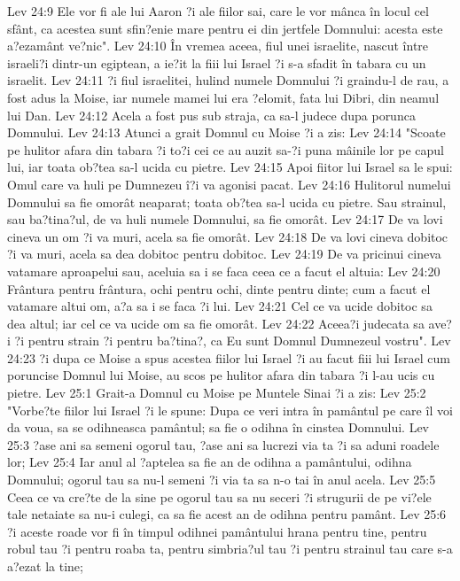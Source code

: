 Lev 24:9  Ele vor fi ale lui Aaron ?i ale fiilor sai, care le vor mânca în locul cel sfânt, ca acestea sunt sfin?enie mare pentru ei din jertfele Domnului: acesta este a?ezamânt ve?nic".
Lev 24:10  În vremea aceea, fiul unei israelite, nascut între israeli?i dintr-un egiptean, a ie?it la fiii lui Israel ?i s-a sfadit în tabara cu un israelit.
Lev 24:11  ?i fiul israelitei, hulind numele Domnului ?i graindu-l de rau, a fost adus la Moise, iar numele mamei lui era ?elomit, fata lui Dibri, din neamul lui Dan.
Lev 24:12  Acela a fost pus sub straja, ca sa-l judece dupa porunca Domnului.
Lev 24:13  Atunci a grait Domnul cu Moise ?i a zis:
Lev 24:14  "Scoate pe hulitor afara din tabara ?i to?i cei ce au auzit sa-?i puna mâinile lor pe capul lui, iar toata ob?tea sa-l ucida cu pietre.
Lev 24:15  Apoi fiitor lui Israel sa le spui: Omul care va huli pe Dumnezeu î?i va agonisi pacat.
Lev 24:16  Hulitorul numelui Domnului sa fie omorât neaparat; toata ob?tea sa-l ucida cu pietre. Sau strainul, sau ba?tina?ul, de va huli numele Domnului, sa fie omorât.
Lev 24:17  De va lovi cineva un om ?i va muri, acela sa fie omorât.
Lev 24:18  De va lovi cineva dobitoc ?i va muri, acela sa dea dobitoc pentru dobitoc.
Lev 24:19  De va pricinui cineva vatamare aproapelui sau, aceluia sa i se faca ceea ce a facut el altuia:
Lev 24:20  Frântura pentru frântura, ochi pentru ochi, dinte pentru dinte; cum a facut el vatamare altui om, a?a sa i se faca ?i lui.
Lev 24:21  Cel ce va ucide dobitoc sa dea altul; iar cel ce va ucide om sa fie omorât.
Lev 24:22  Aceea?i judecata sa ave?i ?i pentru strain ?i pentru ba?tina?, ca Eu sunt Domnul Dumnezeul vostru".
Lev 24:23  ?i dupa ce Moise a spus acestea fiilor lui Israel ?i au facut fiii lui Israel cum poruncise Domnul lui Moise, au scos pe hulitor afara din tabara ?i l-au ucis cu pietre.
Lev 25:1  Grait-a Domnul cu Moise pe Muntele Sinai ?i a zis:
Lev 25:2  "Vorbe?te fiilor lui Israel ?i le spune: Dupa ce veri intra în pamântul pe care îl voi da voua, sa se odihneasca pamântul; sa fie o odihna în cinstea Domnului.
Lev 25:3  ?ase ani sa semeni ogorul tau, ?ase ani sa lucrezi via ta ?i sa aduni roadele lor;
Lev 25:4  Iar anul al ?aptelea sa fie an de odihna a pamântului, odihna Domnului; ogorul tau sa nu-l semeni ?i via ta sa n-o tai în anul acela.
Lev 25:5  Ceea ce va cre?te de la sine pe ogorul tau sa nu seceri ?i strugurii de pe vi?ele tale netaiate sa nu-i culegi, ca sa fie acest an de odihna pentru pamânt.
Lev 25:6  ?i aceste roade vor fi în timpul odihnei pamântului hrana pentru tine, pentru robul tau ?i pentru roaba ta, pentru simbria?ul tau ?i pentru strainul tau care s-a a?ezat la tine;
